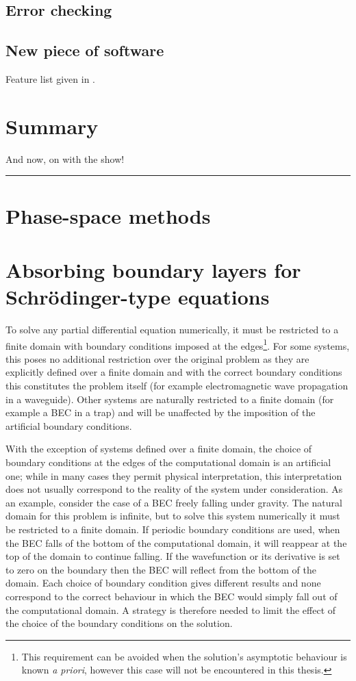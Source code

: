 \subsection{Error checking}
\subsection{New piece of software}
Feature list given in .

\section{Summary}
And now, on with the show!
\hrule


\section{Phase-space methods}
\label{BackgroundTheory:PhaseSpaceMethods}

\section{Absorbing boundary layers for Schrödinger-type equations}
\label{BackgroundTheory:AbsorbingBoundaryLayers}


To solve any partial differential equation numerically, it must be restricted to a finite domain with boundary conditions imposed at the edges\footnote{This requirement can be avoided when the solution's asymptotic behaviour is known \emph{a priori}, however this case will not be encountered in this thesis.}. For some systems, this poses no additional restriction over the original problem as they are explicitly defined over a finite domain and with the correct boundary conditions this constitutes the problem itself (for example electromagnetic wave propagation in a waveguide). Other systems are naturally restricted to a finite domain (for example a BEC in a trap) and will be unaffected by the imposition of the artificial boundary conditions. 

With the exception of systems defined over a finite domain, the choice of boundary conditions at the edges of the computational domain is an artificial one; while in many cases they permit physical interpretation, this interpretation does not usually correspond to the reality of the system under consideration. As an example, consider the case of a BEC freely falling under gravity. The natural domain for this problem is infinite, but to solve this system numerically it must be restricted to a finite domain. If periodic boundary conditions are used, when the BEC falls of the bottom of the computational domain, it will reappear at the top of the domain to continue falling. If the wavefunction or its derivative is set to zero on the boundary then the BEC will reflect from the bottom of the domain. Each choice of boundary condition gives different results and none correspond to the correct behaviour in which the BEC would simply fall out of the computational domain. A strategy is therefore needed to limit the effect of the choice of the boundary conditions on the solution.

